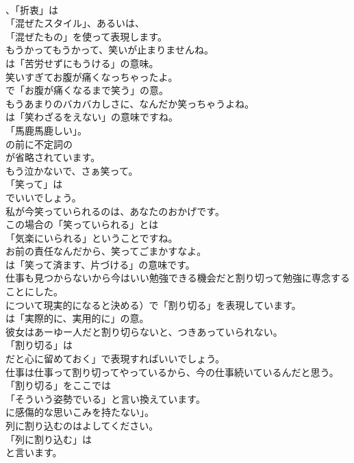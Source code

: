 \documentclass[8pt]{extreport}
\begin{document}
\begin{CJK}{UTF8}{min}
\\	、「折衷」は
\\	「混ぜたスタイル」、あるいは、
\\	「混ぜたもの」を使って表現します。	
\\	もうかってもうかって、笑いが止まりませんね。 
\\	は「苦労せずにもうける」の意味。	
\\	笑いすぎてお腹が痛くなっちゃったよ。 
\\	で「お腹が痛くなるまで笑う」の意。	
\\	もうあまりのバカバカしさに、なんだか笑っちゃうよね。 
\\	は「笑わざるをえない」の意味ですね。
\\	「馬鹿馬鹿しい」。
\\	の前に不定詞の
\\	が省略されています。	
\\	もう泣かないで、さぁ笑って。 
\\	「笑って」は 
\\	でいいでしょう。	
\\	私が今笑っていられるのは、あなたのおかげです。 
\\	この場合の「笑っていられる」とは
\\	「気楽にいられる」ということですね。	
\\	お前の責任なんだから、笑ってごまかすなよ。 
\\	は「笑って済ます、片づける」の意味です。	
\\	仕事も見つからないから今はいい勉強できる機会だと割り切って勉強に専念することにした。 
\\	について現実的になると決める）で「割り切る」を表現しています。
\\	は「実際的に、実用的に」の意。	
\\	彼女はあーゆー人だと割り切らないと、つきあっていられない。 
\\	「割り切る」は
\\	だと心に留めておく」で表現すればいいでしょう。	
\\	仕事は仕事って割り切ってやっているから、今の仕事続いているんだと思う。 
\\	「割り切る」をここでは
\\	「そういう姿勢でいる」と言い換えています。
\\	に感傷的な思いこみを持たない」。	
\\	列に割り込むのはよしてください。 
\\	「列に割り込む」は
\\	と言います。	

\end{CJK}
\end{document}
